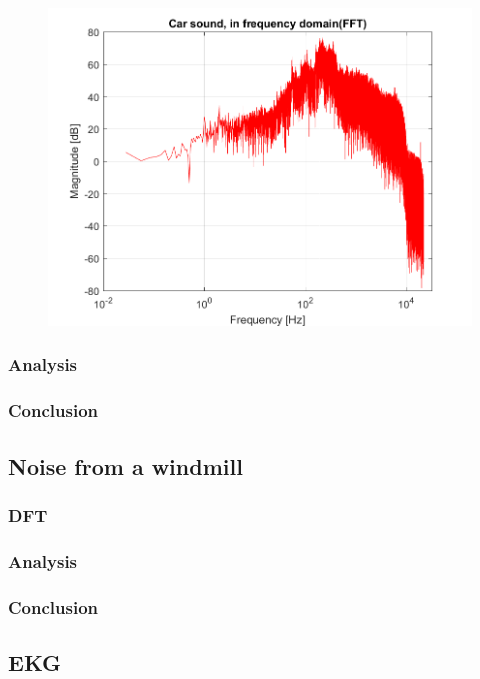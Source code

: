 \begin{figure}
	\centering
	\includegraphics[width=\textwidth]{code/Car_figure2.png}
	\caption{}
	\label{fig:Car_DFT}
\end{figure}




\subsubsection{Analysis}




\subsubsection{Conclusion}

\subsection{Noise from a windmill}
\subsubsection{DFT}

\subsubsection{Analysis}

\subsubsection{Conclusion}

\subsection{EKG}
